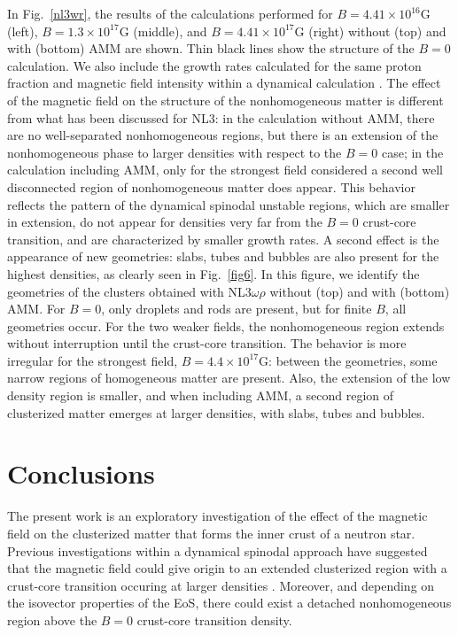 \documentclass[epj]{svjour}
\begin{document}
In Fig.~\ref{nl3wr}, the results of the calculations performed for  $B= 4.41 \times 10^{16}$G (left),  $B= 1.3 \times
    10^{17}$G (middle), and  $B= 4.41 \times 10^{17}$G  (right)  without (top)
  and with  (bottom) AMM are shown.  Thin black lines show the
    structure of the $B=0$ calculation. We also include the growth
    rates calculated for the same proton fraction  and magnetic field
    intensity within a dynamical
    calculation \cite{Fang17,Fang17a}. The effect of the magnetic
    field on the structure of the nonhomogeneous matter is different
    from what has been discussed for NL3: in the calculation without AMM, there are no well-separated  nonhomogeneous regions, but there is an extension of the
    nonhomogeneous phase to
    larger densities with respect to the $B=0$ case; in the calculation including AMM, only for the
    strongest field considered a second well disconnected
    region of nonhomogeneous matter does appear. This behavior reflects the pattern of the
    dynamical spinodal unstable regions, which are smaller in
    extension, do not appear for densities very far from the $B=0$
    crust-core transition, and  are characterized by smaller growth rates.
    A second effect is the appearance of new
    geometries:  slabs, tubes and bubbles are also present for the
    highest densities,  as clearly seen in  Fig.~\ref{fig6}.
 In this figure, we identify the geometries of the clusters
      obtained with NL3$\omega\rho$ without (top) and with (bottom)
      AMM.
         For $B=0$, only droplets and
   rods are present, but for  finite $B$,  all geometries occur.
For the two weaker fields, the nonhomogeneous region extends without interruption
   until the crust-core transition. The behavior is more irregular for
   the strongest field,  $B=4.4\times 10^{17}$G: between the
   geometries, some narrow regions of homogeneous matter are present. Also, the extension of the low density region is smaller, and when including AMM,  a
  second region of clusterized matter  emerges at larger densities, with
  slabs, tubes and bubbles. 




\section{Conclusions} \label{sec:conclusions}

The present work is an exploratory investigation of the effect of the
magnetic field on the clusterized matter that forms the inner crust of
a neutron star. Previous investigations within a dynamical spinodal
approach have suggested that the magnetic field could give origin to
an extended clusterized region with a crust-core transition occuring
at larger densities \cite{Fang16,Fang17,Fang17a}. Moreover, and depending on the isovector
properties of the EoS, there could exist a detached nonhomogeneous
region above the $B=0$ crust-core transition density. 
\end{document}
